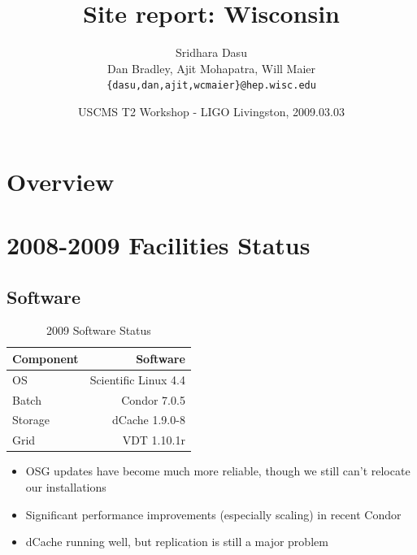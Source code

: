 \documentclass{beamer}
\title{Site report: Wisconsin}
\author[Maier]{
    Sridhara Dasu \\
    Dan Bradley, Ajit Mohapatra, Will Maier
    {\tt \{dasu,dan,ajit,wcmaier\}@hep.wisc.edu}}
\institute[Wisconsin]{University of Wisconsin - High Energy Physics}
\date[2009.03.03]{USCMS T2 Workshop - LIGO Livingston, 2009.03.03}
\begin{document}

\begin{frame}
    \titlepage
\end{frame}

\section{Overview}
\begin{frame}
    \tableofcontents
\end{frame}

\section{2008-2009 Facilities Status}
\subsection{Software}
\begin{frame}
\begin{table}
\begin{tabular}{lr}
    \toprule
    Component   &   Software \\
    \midrule
    OS          &   Scientific Linux 4.4 \\
    Batch       &   Condor 7.0.5 \\
    Storage     &   dCache 1.9.0-8 \\
    Grid        &   VDT 1.10.1r \\
    \bottomrule
\end{tabular}
\caption{2009 Software Status}
\label{2009_software_status}
\end{table}

\begin{itemize}
    \item OSG updates have become much more reliable, though we still can't relocate our installations
    \item Significant performance improvements (especially scaling) in recent Condor
    \item dCache running well, but replication is still a major problem
\end{itemize}

\end{frame}
\end{document}
